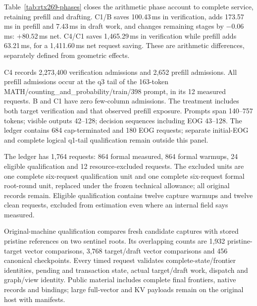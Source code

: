 Table~\ref{tab:rtx269-phases} closes the arithmetic phase account to complete service, retaining prefill and drafting. C1/B saves 100.43\,ms in verification, adds 173.57\,ms in prefill and 7.43\,ms in draft work, and changes remaining stages by $-0.06$\,ms: $+80.52$\,ms net. C4/C1 saves 1,465.29\,ms in verification while prefill adds 63.21\,ms, for a 1,411.60\,ms net request saving. These are arithmetic differences, separately defined from geometric effects.


C4 records 2,273,400 verification admissions and 2,652 prefill admissions. All prefill admissions occur at the q3 tail of the 163-token MATH/counting\_and\_probability/train/398 prompt, in its 12 measured requests. B and C1 have zero few-column admissions. The treatment includes both target verification and that observed prefill exposure. Prompts span 140--757 tokens; visible outputs 42--128; decision sequences including EOG 43--128. The ledger contains 684 cap-terminated and 180 EOG requests; separate initial-EOG and complete logical q1-tail qualification remain outside this panel.

The ledger has 1,764 requests: 864 formal measured, 864 formal warmups, 24 eligible qualification and 12 resource-excluded requests. The excluded units are one complete six-request qualification unit and one complete six-request formal root-round unit, replaced under the frozen technical allowance; all original records remain. Eligible qualification contains twelve capture warmups and twelve clean requests, excluded from estimation even where an internal field says measured.

\begin{samepage}
Original-machine qualification compares fresh candidate captures with stored pristine references on two sentinel roots. Its overlapping counts are 1,932 pristine-target vector comparisons, 3,768 target/draft vector comparisons and 456 canonical checkpoints. Every timed request validates complete-state/frontier identities, pending and transaction state, actual target/draft work, dispatch and graph/view identity. Public material includes complete final frontiers, native records and bindings; large full-vector and KV payloads remain on the original host with manifests.
\par
\end{samepage}